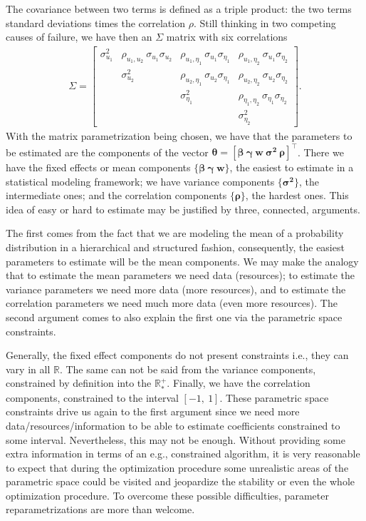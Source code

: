 The covariance between two terms is defined as a triple product: the two
terms standard deviations times the correlation \(\rho\). Still
thinking in two competing causes of failure, we have then an \(\Sigma\)
matrix with six correlations
\begin{align*}
 \Sigma = \begin{bmatrix}
           \sigma_{u_{1}}^{2}&
           \rho_{u_{1},u_{2}}~\sigma_{u_{1}}\sigma_{u_{2}}&
           \rho_{u_{1},\eta_{1}}~\sigma_{u_{1}}\sigma_{\eta_{1}}&
           \rho_{u_{1},\eta_{2}}~\sigma_{u_{1}}\sigma_{\eta_{2}}\\
           &\sigma_{u_{2}}^{2}&
           \rho_{u_{2},\eta_{1}}~\sigma_{u_{2}}\sigma_{\eta_{1}}&
           \rho_{u_{2},\eta_{2}}~\sigma_{u_{2}}\sigma_{\eta_{2}}\\
           &&\sigma_{\eta_{1}}^{2}&
           \rho_{\eta_{1},\eta_{2}}~\sigma_{\eta_{1}}\sigma_{\eta_{2}}\\
           &&&\sigma_{\eta_{2}}^{2}
          \end{bmatrix}.
\end{align*}
With the matrix parametrization being chosen, we have that the
parameters to be estimated are the components of the vector
\(\bm{\theta} = [\bm{\beta}~ \bm{\gamma}~\bm{w}~\bm{\sigma^{2}}~
\bm{\rho}]^{\top}\). There we have the fixed effects or mean components
\(\{\bm{\beta}~\bm{\gamma}~\bm{w}\}\), the easiest to estimate in a
statistical modeling framework; we have variance components
\(\{\bm{\sigma^{2}}\}\), the intermediate ones; and the correlation
components \(\{\bm{\rho}\}\), the hardest ones. This idea of easy or
hard to estimate may be justified by three, connected, arguments.

The first comes from the fact that we are modeling the mean of a
probability distribution in a hierarchical and structured fashion,
consequently, the easiest parameters to estimate will be the mean
components. We may make the analogy that to estimate the mean parameters
we need data (resources); to estimate the variance parameters we need
more data (more resources), and to estimate the correlation parameters
we need much more data (even more resources). The second argument comes
to also explain the first one via the parametric space constraints.

Generally, the fixed effect components do not present constraints i.e.,
they can vary in all \(\mathbb{R}\). The same can not be said from the
variance components, constrained by definition into the
\(\mathbb{R}_{\ast}^{+}\). Finally, we have the correlation components,
constrained to the interval \([-1,~1]\). These parametric space
constraints drive us again to the first argument since we need more
data/resources/information to be able to estimate coefficients
constrained to some interval. Nevertheless, this may not be enough.
Without providing some extra information in terms of an e.g.,
constrained algorithm, it is very reasonable to expect that during the
optimization procedure some unrealistic areas of the parametric space
could be visited and jeopardize the stability or even the whole
optimization procedure. To overcome these possible difficulties,
parameter reparametrizations are more than welcome.

